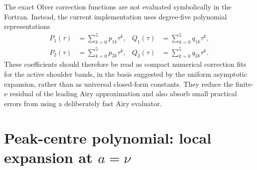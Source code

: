 \documentclass[11pt,a4paper]{article}
\begin{document}
The exact Olver correction functions are not evaluated symbolically in the Fortran.  Instead, the current implementation uses degree-five polynomial representations
\begin{align}
  P_1(\tau)&=\sum_{k=0}^5 p_{1k}\tau^k,
  & Q_1(\tau)&=\sum_{k=0}^5 q_{1k}\tau^k,\\
  P_2(\tau)&=\sum_{k=0}^5 p_{2k}\tau^k,
  & Q_2(\tau)&=\sum_{k=0}^5 q_{2k}\tau^k.
\end{align}
These coefficients should therefore be read as compact numerical correction fits for the active shoulder bands, in the basis suggested by the uniform asymptotic expansion, rather than as universal closed-form constants.  They reduce the finite-$\nu$ residual of the leading Airy approximation and also absorb small practical errors from using a deliberately fast Airy evaluator.

\begin{table}[htbp]
\centering
\scriptsize
{}
\caption{Current correction-polynomial coefficients in code order, from constant term to degree five.}
\label{tab:airy-coeffs}
\end{table}

\section{\texorpdfstring{Peak-centre polynomial: local expansion at $a=\nu$}{Peak-centre polynomial: local expansion at a=nu}}
\end{document}
